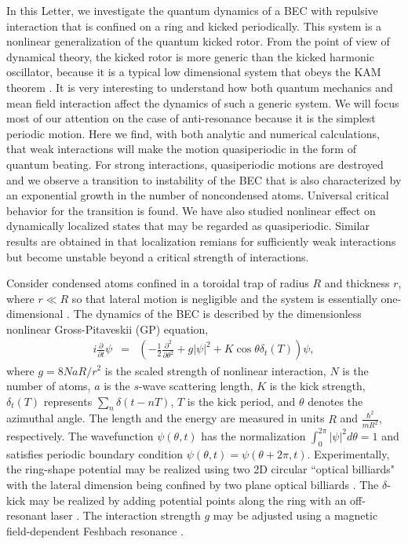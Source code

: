 \documentclass[twocolumn,prl,aps,showpacs]{revtex4}
\begin{document}
In this Letter, we investigate the quantum dynamics of 
a BEC with repulsive interaction that is confined on a ring and kicked
periodically.  This system is a nonlinear generalization
of the quantum kicked rotor. From the point of view of dynamical theory, the kicked rotor is more generic than the kicked harmonic oscillator, 
because it is a typical low dimensional system that obeys 
the KAM theorem \cite{liu1}. It is very interesting
to understand how both quantum mechanics and mean field interaction
affect the dynamics of such a generic system.  We will focus most of our attention on the case of anti-resonance 
because it is the simplest periodic motion.  Here we find, with both analytic and numerical calculations, 
that weak interactions will make the motion quasiperiodic in the form of quantum beating. 
For strong interactions, quasiperiodic motions are destroyed and we observe a transition to instability of the
BEC that is also characterized by an exponential growth in the number of 
noncondensed atoms. Universal critical behavior for the transition is found. 
We have also studied nonlinear effect on dynamically localized states that may be regarded as quasiperiodic.  
Similar results are obtained in that localization remians for sufficiently weak interactions but become unstable 
beyond a critical strength of interactions. 

Consider condensed atoms confined in a toroidal trap of radius $R$
and thickness $r$, where $r \ll R$ so that lateral motion is
negligible and the system is essentially one-dimensional \cite{ring}. 
The dynamics of the BEC is described by the dimensionless
nonlinear Gross-Pitaveskii (GP) equation, 
\begin{eqnarray}
i\frac \partial {\partial t}\psi &=&\left( -\frac 12%
\frac{\partial ^2}{\partial \theta ^2}+g\left| \psi \right| ^2+K\cos\theta\delta_t(T)\right) \psi, \label{1}
\end{eqnarray}
where $g=8NaR/r^2$ is the scaled strength of nonlinear interaction,  $N$ is
the number of atoms, $a$ is the $s$-wave scattering length, $K$ is the kick
strength, $\delta_t(T)$ represents $\sum\limits_n\delta \left( t-nT\right)$, $T$ is the kick period, and $\theta $ denotes the azimuthal angle.
The length and the energy are measured in units $R$ and $\frac{\hbar ^2}{mR^2%
}$, respectively. The wavefunction $\psi \left( \theta ,t\right) $ has
the normalization $\int_0^{2\pi }\left| \psi \right| ^2d\theta =1$ and satisfies periodic boundary condition $\psi \left(
\theta ,t\right) =\psi \left( \theta +2\pi ,t\right) $. Experimentally, the ring-shape potential may be realized using two 2D
circular ``optical billiards" with the lateral dimension being confined by
two plane optical billiards \cite{billiard}. The 
$\delta $-kick may be realized by adding potential points along the ring
with an off-resonant laser \cite{raizen}.  The
interaction strength $g$ may be adjusted using a magnetic field-dependent Feshbach
resonance \cite{Feshbach}.
\end{document}
